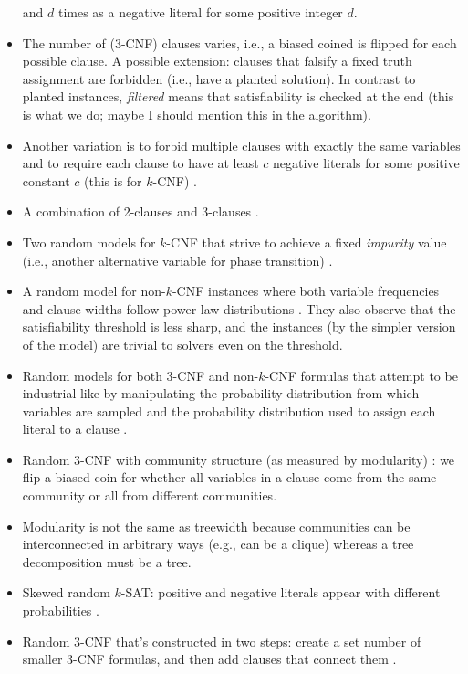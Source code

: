 \documentclass{article}
\theoremstyle{definition}
\theoremstyle{remark}
\begin{document}
\begin{itemize}
  and $d$ times as a negative literal for some positive integer $d$.
\item The number of (3-CNF) clauses varies, i.e., a biased coined is flipped
  for each possible clause. A possible extension: clauses that falsify a fixed
  truth assignment are forbidden \cite{DBLP:conf/lics/Atserias05a} (i.e., have a
  planted solution). In contrast to planted instances, \emph{filtered} means
  that satisfiability is checked at the end (this is what we do; maybe I should
  mention this in the algorithm).
\item Another variation is to forbid multiple clauses with exactly the same
  variables and to require each clause to have at least $c$ negative literals
  for some positive constant $c$ (this is for $k$-CNF)
  \cite{DBLP:journals/ai/Gao09}.
\item A combination of 2-clauses and 3-clauses
  \cite{DBLP:conf/sat/AchlioptasM12}.
\item Two random models for $k$-CNF that strive to achieve a fixed
  \emph{impurity} value (i.e., another alternative variable for phase
  transition) \cite{DBLP:journals/jsat/Lozinskii06}.
\item A random model for non-$k$-CNF instances where both variable frequencies
  and clause widths follow power law distributions
  \cite{DBLP:conf/ijcai/Giraldez-CruL17}. They also observe that the
  satisfiability threshold is less sharp, and the instances (by the simpler
  version of the model) are trivial to \SAT{} solvers even on the threshold.
\item Random models for both 3-CNF and non-$k$-CNF formulas that attempt to be
  industrial-like by manipulating the probability distribution from which
  variables are sampled and the probability distribution used to assign each
  literal to a clause \cite{DBLP:conf/ijcai/AnsoteguiBL09}.
\item Random 3-CNF with community structure (as measured by modularity)
  \cite{DBLP:journals/ai/Giraldez-CruL16}: we flip a biased coin for whether all
  variables in a clause come from the same community or all from different
  communities.
\item Modularity is not the same as treewidth because communities can be
  interconnected in arbitrary ways (e.g., can be a clique) whereas a tree
  decomposition must be a tree.
\item Skewed random $k$-SAT: positive and negative literals appear with
  different probabilities \cite{DBLP:conf/sat/Sinopalnikov04}.
\item Random 3-CNF that's constructed in two steps: create a set number of
  smaller 3-CNF formulas, and then add clauses that connect them
  \cite{DBLP:conf/ausai/Slater02}.
\end{itemize}
\end{document}
